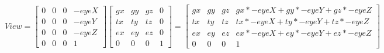 $
View = 
\begin{bmatrix} 
0 & 0 & 0 & -eyeX \\
0 & 0 & 0 & -eyeY \\
0 & 0 & 0 & -eyeZ \\
0 & 0 & 0 & 1
\end{bmatrix}
\begin{bmatrix} 
gx & gy & gz & 0 \\
tx & ty & tz & 0 \\
ex & ey & ez & 0 \\
0 & 0 & 0 & 1
\end{bmatrix}
=
\begin{bmatrix} 
gx & gy & gz & gx * -eyeX + gy * -eyeY + gz * -eyeZ \\
tx & ty & tz & tx * -eyeX + ty * -eyeY + tz * -eyeZ \\
ex & ey & ez & ex * -eyeX + ey * -eyeY + ez * -eyeZ \\
0 & 0 & 0 & 1
\end{bmatrix}
$